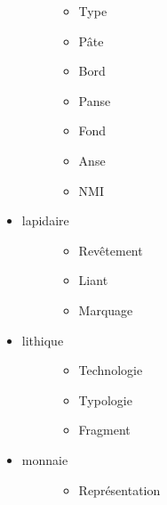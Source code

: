 \documentclass[letterpaper,10pt,french]{sphinxmanual}
\begin{document}
\begin{itemize}
\begin{description}
\begin{itemize}
\item {} 
Type

\item {} 
Pâte

\item {} 
Bord

\item {} 
Panse

\item {} 
Fond

\item {} 
Anse

\item {} 
NMI

\end{itemize}

\end{description}

\item {} \begin{description}
\item[{lapidaire}] \leavevmode\begin{itemize}
\item {} 
Revêtement

\item {} 
Liant

\item {} 
Marquage

\end{itemize}

\end{description}

\item {} \begin{description}
\item[{lithique}] \leavevmode\begin{itemize}
\item {} 
Technologie

\item {} 
Typologie

\item {} 
Fragment

\end{itemize}

\end{description}

\item {} \begin{description}
\item[{monnaie}] \leavevmode\begin{itemize}
\item {} 
Représentation


\end{itemize}
\end{description}
\end{itemize}
\end{document}
